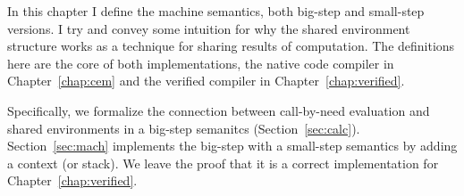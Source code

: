 In this chapter I define the \ce machine semantics, both big-step and small-step
versions. I try and convey some intuition for why the shared environment
structure works as a technique for sharing results of computation. The
definitions here are the core of both implementations, the native code compiler
in Chapter~\ref{chap:cem} and the verified compiler in
Chapter~\ref{chap:verified}.

Specifically, we formalize the connection between call-by-need evaluation and
shared environments in a big-step semanitcs (Section~\ref{sec:calc}).
Section~\ref{sec:mach} implements the big-step with a small-step semantics by
adding a context (or stack). We leave the proof that it is a correct
implementation for Chapter~\ref{chap:verified}.
